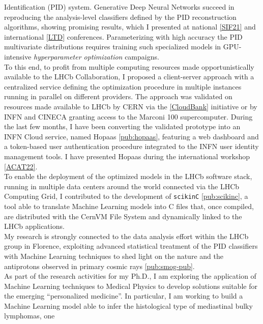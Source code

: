 \begin{cvcontent}
  Identification (PID) system. Generative Deep Neural Networks
  succeed in reproducing the analysis-level classifiers defined 
  by the PID reconstruction algorithms, showing promising results,
  which I presented at national \hyperlink{sif-2021}{[SIF21]} 
  and international \hyperlink{ltd}{[LTD]} conferences. 
  Parameterizing with high accuracy the PID multivariate 
  distributions requires training such specialized models
  in GPU-intensive \emph{hyperparameter optimization} campaigns.
  \\
  To this end, to profit from multiple computing resources made 
  opportunistically available to the LHCb Collaboration, I proposed 
  a client-server approach with a centralized service defining the 
  optimization procedure in multiple instances running in parallel 
  on different providers. The approach was validated on resources made 
  available to LHCb by CERN via the \hyperlink{cloud-bank}{[CloudBank]} 
  initiative or by INFN and CINECA granting access to the Marconi 100 
  supercomputer. During the last few months, I have been converting the 
  validated prototype into an INFN Cloud service, named Hopaas 
  \ref{pub:hopaas}, featuring a web dashboard and a token-based user 
  authentication procedure integrated to the INFN user identity management 
  tools. I have presented Hopaas during the international 
  workshop \hyperlink{acat-2022}{[ACAT22]}.
  \\ [2mm]
  To enable the deployment of the optimized models in the LHCb software 
  stack, running in multiple data centers around the world connected 
  via the LHCb Computing Grid, I contributed to the development of 
  \texttt{scikinC} \ref{pub:scikinc}, a tool able to translate 
  Machine Learning models into C files that, once compiled, 
  are distributed with the CernVM File System and dynamically 
  linked to the LHCb applications.
  \\ [2mm]
  My research is strongly connected to the data analysis effort within 
  the LHCb group in Florence, exploiting advanced statistical treatment 
  of the PID classifiers with Machine Learning techniques to shed light 
  on the nature and the antiprotons observed in primary cosmic rays 
  \ref{pub:smog-pub}.
  \\ [2mm]
  As part of the research activities for my Ph.D., I am exploring the 
  application of Machine Learning techniques to Medical Physics to 
  develop solutions suitable for the emerging ``personalized medicine''. 
  In particular, I am working to build a Machine Learning model able 
  to infer the histological type of mediastinal bulky lymphomas, one 

\end{cvcontent}
